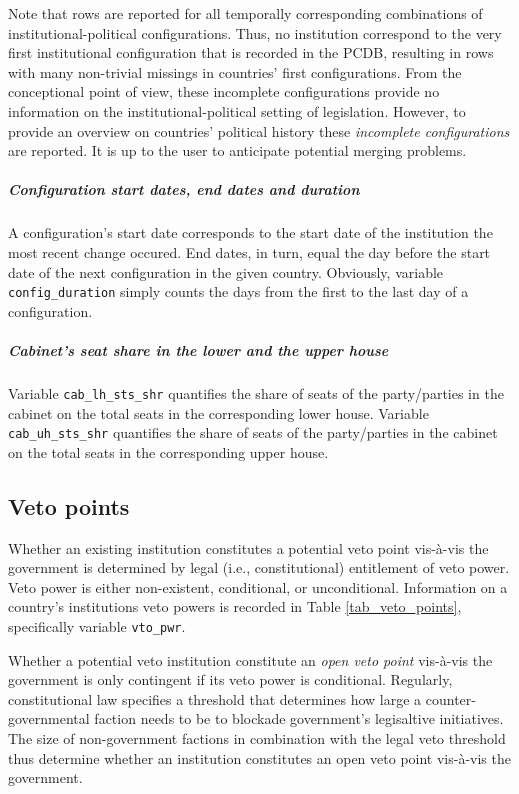 Note that rows are reported for all temporally corresponding combinations of institutional-political configurations. Thus, no institution correspond to the very first institutional configuration that is recorded in the PCDB, resulting in rows with many non-trivial missings in countries' first configurations. From the conceptional point of view, these incomplete configurations provide no information on the institutional-political setting of legislation. However, to provide an overview on countries' political history these \emph{incomplete configurations} are reported. It is up to the user to anticipate potential merging problems.



\subparagraph{Configuration start dates, end dates and duration}
A configuration's start date corresponds to the start date of the institution the most recent change occured. End dates, in turn, equal the day before the start date of the next configuration in the given country.
Obviously, variable \texttt{\footnotesize config\_duration} simply counts the days from the first to the last day of a configuration.

\subparagraph{Cabinet's seat share in the lower and the upper house}
Variable \texttt{\footnotesize cab\_lh\_sts\_shr} quantifies the share of seats of the party/parties in the cabinet on the total seats in the corresponding lower house.
Variable \texttt{\footnotesize cab\_uh\_sts\_shr} quantifies the share of seats of the party/parties in the cabinet on the total seats in the corresponding upper house.
 

\subsection{Veto points}
Whether an existing institution constitutes a potential veto point vis-\`a-vis the government is determined by legal (i.e., constitutional) entitlement of veto power. Veto power is either non-existent, conditional, or unconditional. Information on a country's institutions veto powers is recorded in Table \ref{tab_veto_points}, specifically variable \texttt{\footnotesize vto\_pwr}.

Whether a potential veto institution constitute an \emph{open veto point} vis-\`a-vis the government is only contingent if its veto power is conditional. Regularly, constitutional law specifies a threshold that determines how large a counter-governmental faction needs to be to blockade government's legisaltive initiatives. 
The size of non-government factions in combination with the legal veto threshold thus determine whether an institution constitutes an open veto point vis-\`a-vis the government.

